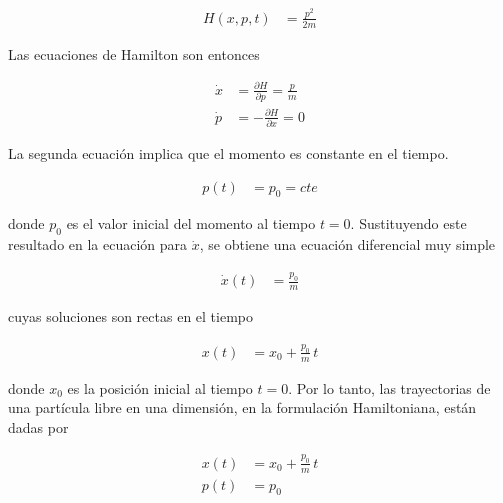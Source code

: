 \documentclass{article}
\begin{document}
\begin{equation}
\begin{split}
H(x,p,t) &= \frac{p^{2}}{2m}
\end{split}
\label{eq:H-libre}
\end{equation}

Las ecuaciones de Hamilton son entonces

\begin{equation}
\begin{split}
\dot{x} &= \frac{\partial H}{\partial p} =  \frac{p}{m} \\[4pt]
\dot{p} &= -\frac{\partial H}{\partial x} = 0
\end{split}
\label{eq:hamilton-libre}
\end{equation}

La segunda ecuación implica que el momento es constante en el tiempo.


\begin{equation}
\begin{split}
p(t) &= p_{0} = cte
\end{split}
\end{equation}

donde $p_{0}$ es el valor inicial del momento al tiempo $t=0$.  
Sustituyendo este resultado en la ecuación para $\dot{x}$, se obtiene una ecuación
diferencial muy simple

\begin{equation}
\begin{split}
\dot{x}(t) &= \frac{p_{0}}{m}
\end{split}
\end{equation}

cuyas soluciones son rectas en el tiempo

\begin{equation}
\begin{split}
x(t) &= x_{0} + \frac{p_{0}}{m}\,t
\end{split}
\end{equation}

donde $x_{0}$ es la posición inicial al tiempo $t=0$.  
Por lo tanto, las trayectorias de una partícula libre en una dimensión, en la
formulación Hamiltoniana, están dadas por

\begin{equation}
\begin{split}
x(t) &= x_{0} + \frac{p_{0}}{m}\,t \\
p(t) &= p_{0}
\end{split}
\end{equation}
\end{document}
